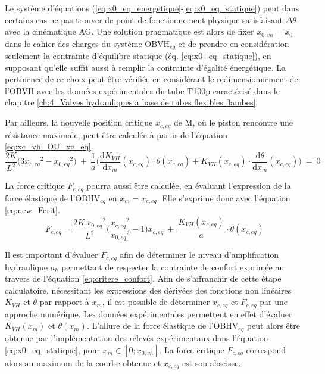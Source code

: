 Le système d'équations (\ref{eq:x0_eq_energetique}-\ref{eq:x0_eq_statique}) peut dans certains cas ne pas trouver de point de fonctionnement physique satisfaisant $\Delta\theta$ avec la cinématique AG. Une solution pragmatique est alors de fixer $x_{0,vh} = x_0$ dans le cahier des charges du système OBVH$_{eq}$ et de prendre en considération seulement la contrainte d'équilibre statique (éq. \ref{eq:x0_eq_statique}), en supposant qu'elle suffit aussi à remplir la contrainte d'égalité énergétique. La pertinence de ce choix peut être vérifiée en considérant le redimensionnement de l'OBVH avec les données expérimentales du tube T100p caractérisé dans le chapitre \ref{ch:4_Valves hydrauliques a base de tubes flexibles flambes}.

Par ailleurs, la nouvelle position critique $x_{c,eq}$ de M, où le piston rencontre une résistance maximale, peut être calculée à partir de l'équation \ref{eq:xc_vh_OU_xc_eq}.
\begin{equation}
\dfrac{2K}{L^2}\biggl(3{x_{c,eq}}^2-{x_{0,eq}}^2\biggr) \ 
+\ 
\frac{1}{a}\biggl( \dfrac{\text{d}K_{VH}}{\text{d}x_m}(x_{c,eq}) \cdot \theta(x_{c,eq}) + K_{VH}(x_{c,eq}) \cdot \dfrac{\text{d} \theta}{\text{d} x_m}(x_{c,eq}) \biggr)
\ =\ 0
\label{eq:xc_vh_OU_xc_eq}
\end{equation}

La force critique $F_{c,eq}$ pourra aussi être calculée, en évaluant l'expression de la force élastique de l'OBHV$_{eq}$ en $x_m=x_{c,eq}$. Elle s'exprime donc avec l'équation \ref{eq:new_Fcrit}.
\begin{equation}
F_{c,eq} = \frac{2K\ {x_{0,eq}}^2}{L^2}\biggl(\frac{{x_{c,eq}}^2}{{x_{0,eq}}^2}-1\biggr)x_{c,eq}
\ +\ 
\frac{K_{VH}(x_{c,eq})}{a}\cdot \theta({x_{c,eq}})
\label{eq:new_Fcrit}
\end{equation}

Il est important d'évaluer $F_{c,eq}$ afin de déterminer le niveau d'amplification hydraulique $a_h$ permettant de respecter la contrainte de confort exprimée au travers de l'équation \ref{eq:critere_confort}. Afin de s'affranchir de cette étape calculatoire, nécessitant les expressions des dérivées des fonctions non linéaires $K_{VH}$ et $\theta$ par rapport à $x_m$, il est possible de déterminer $x_{c,eq}$ et $F_{c,eq}$ par une approche numérique. Les données expérimentales permettent en effet d'évaluer $K_{VH}(x_m)$ et $\theta(x_m)$. L'allure de la force élastique de l'OBHV$_{eq}$ peut alors être obtenue par l'implémentation des relevés expérimentaux dans l'équation \ref{eq:x0_eq_statique}, pour $x_m\in[0;x_{0,vh}]$. La force critique $F_{c,eq}$ correspond alors au maximum de la courbe obtenue et $x_{c,eq}$ est son abscisse.
